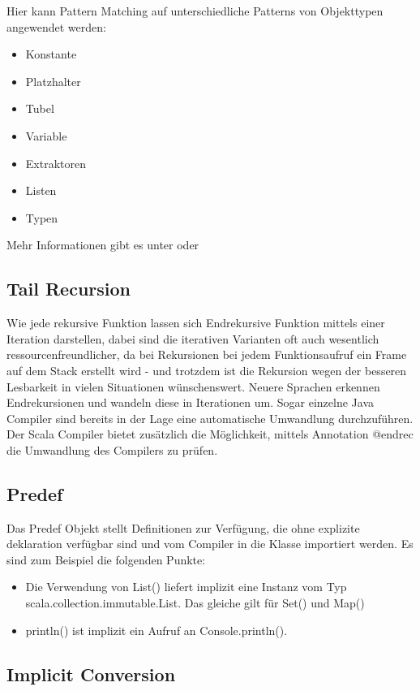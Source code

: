 Hier kann Pattern Matching auf unterschiedliche Patterns von Objekttypen angewendet werden:
\begin{itemize}
	\item Konstante
	\item Platzhalter
	\item Tubel
	\item Variable
	\item Extraktoren
	\item Listen
	\item Typen
\end{itemize}

Mehr Informationen gibt es unter \cite[p. 263-296]{odersky2008programming} oder \cite[p. 167-176]{Piepmeyer201006}

\subsection{Tail Recursion}
Wie jede rekursive Funktion lassen sich Endrekursive\cite{wiki:Endrekursion} Funktion mittels einer Iteration darstellen, dabei sind die iterativen Varianten oft auch wesentlich ressourcenfreundlicher, da bei Rekursionen bei jedem Funktionsaufruf ein Frame auf dem Stack erstellt wird - und trotzdem ist die Rekursion wegen der besseren Lesbarkeit in vielen Situationen w\"unschenswert. Neuere Sprachen erkennen Endrekursionen und wandeln diese in Iterationen um. Sogar einzelne Java Compiler sind bereits in der Lage eine automatische Umwandlung durchzuf\"uhren. Der Scala Compiler bietet zus\"atzlich die M\"oglichkeit, mittels Annotation @endrec die Umwandlung des Compilers zu pr\"ufen.

\subsection{Predef}
Das Predef Objekt stellt Definitionen zur Verf\"ugung, die ohne explizite deklaration verf\"ugbar sind und vom Compiler in die Klasse importiert werden. Es sind zum Beispiel die folgenden Punkte:
\begin{itemize}
	\item Die Verwendung von List() liefert implizit eine Instanz vom Typ scala.collection.immutable.List. Das gleiche gilt f\"ur Set() und Map()
	\item println() ist implizit ein Aufruf an Console.println().
\end{itemize}

\subsection{Implicit Conversion}

